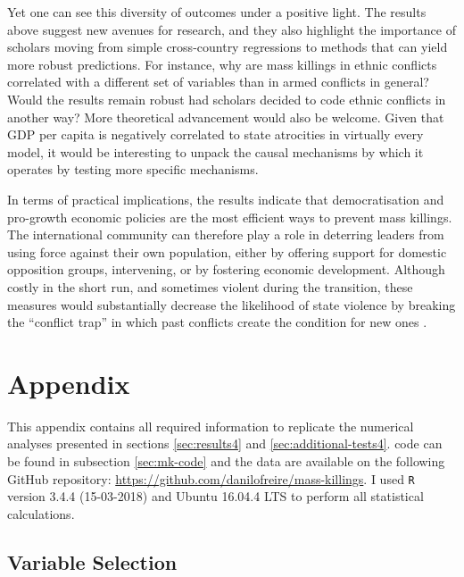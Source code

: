 Yet one can see this diversity of outcomes under a positive light. The results above suggest new avenues for research, and they also highlight the importance of scholars moving from simple cross-country regressions to methods that can yield more robust predictions. For instance, why are mass killings in ethnic conflicts correlated with a different set of variables than in armed conflicts in general? Would the results remain robust had scholars decided to code ethnic conflicts in another way? More theoretical advancement would also be welcome. Given that GDP per capita is negatively correlated to state atrocities in virtually every model, it would be interesting to unpack the causal mechanisms by which it operates by testing more specific mechanisms. 
	
In terms of practical implications, the results indicate that democratisation and pro-growth economic policies are the most efficient ways to prevent mass killings. The international community can therefore play a role in deterring leaders from using force against their own population, either by offering support for domestic opposition groups, intervening, or by fostering economic development. Although costly in the short run, and sometimes violent during the transition, these measures would substantially decrease the likelihood of state violence by breaking the ``conflict trap'' in which past conflicts create the condition for new ones \citep{collier2003breaking}.

\newpage

\section{Appendix} 
\label{sec:mk-appendix}

This appendix contains all required information to replicate the numerical analyses presented in sections \ref{sec:results4} and \ref{sec:additional-tests4}.  code can be found in subsection \ref{sec:mk-code} and the data are available on the following GitHub repository: \href{https://github.com/danilofreire/mass-killings}{https://github.com/danilofreire/mass-killings}. I used \texttt{R} version 3.4.4 (15-03-2018) and Ubuntu 16.04.4 LTS to perform all statistical calculations.

\subsection{Variable Selection}
\label{sec:mk-vs}

